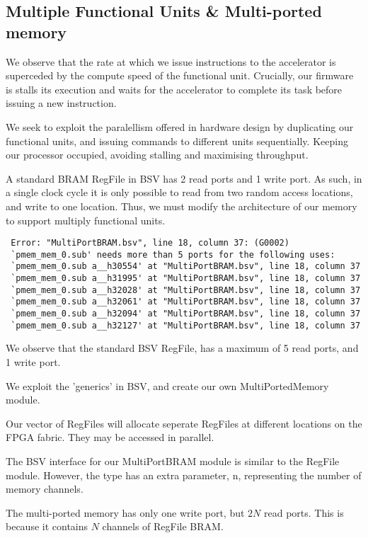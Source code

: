 \documentclass[a4paper,8pt]{report}
\begin{document}

\subsection{Multiple Functional Units \& Multi-ported memory}
We observe that the rate at which we issue instructions to the accelerator is
superceded by the compute speed of the functional unit. Crucially, our firmware
is stalls its execution and waits for the accelerator to complete its task
before issuing a new instruction.

We seek to exploit the paralellism offered in hardware design by duplicating our
functional units, and issuing commands to different units sequentially. Keeping
our processor occupied, avoiding stalling and maximising throughput.

A standard BRAM RegFile in BSV has 2 read ports and 1 write port. As such, in a
single clock cycle it is only possible to read from two random access locations,
and write to one location. Thus, we must modify the architecture of our memory
to support multiply functional units.

\scriptsize
\begin{verbatim}
 Error: "MultiPortBRAM.bsv", line 18, column 37: (G0002)
 `pmem_mem_0.sub' needs more than 5 ports for the following uses:
 `pmem_mem_0.sub a__h30554' at "MultiPortBRAM.bsv", line 18, column 37
 `pmem_mem_0.sub a__h31995' at "MultiPortBRAM.bsv", line 18, column 37
 `pmem_mem_0.sub a__h32028' at "MultiPortBRAM.bsv", line 18, column 37
 `pmem_mem_0.sub a__h32061' at "MultiPortBRAM.bsv", line 18, column 37
 `pmem_mem_0.sub a__h32094' at "MultiPortBRAM.bsv", line 18, column 37
 `pmem_mem_0.sub a__h32127' at "MultiPortBRAM.bsv", line 18, column 37
\end{verbatim}
\normalsize
We observe that the standard BSV RegFile, has a maximum of 5 read ports, and 1 write port.

We exploit the 'generics' in BSV, and create our own MultiPortedMemory module.

Our vector of RegFiles will allocate seperate RegFiles at different locations on
the FPGA fabric. They may be accessed in parallel. 

The BSV interface for our MultiPortBRAM module is similar to the RegFile module.
However, the type has an extra parameter, n, representing the number of memory
channels.

The multi-ported memory has only one write port, but $2N$ read ports. This is
because it contains $N$ channels of RegFile BRAM. 
\end{document}
